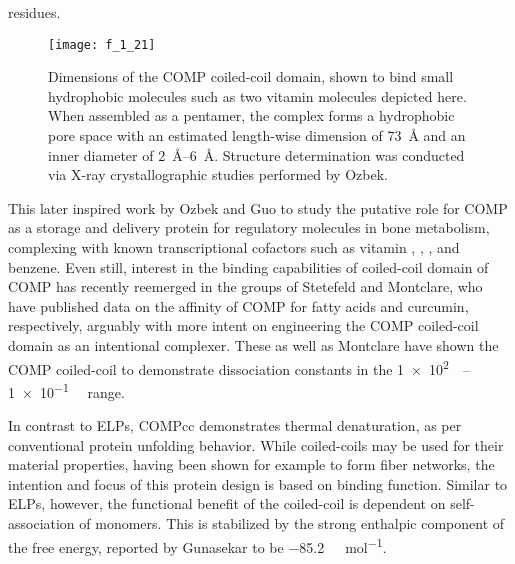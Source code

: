 \begin{refsection}
residues.\cite{Burkhard2001} 
\begin{figure}[h!] \centering \texttt{[image: f\_1\_21]}
    \caption[Dimensions of the COMP coiled-coil domain, shown to bind small
        hydrophobic molecules such as two vitamin  molecules depicted
        here. When assembled as a pentamer, the complex forms a hydrophobic pore
        space with an estimated length-wise dimension of \SI{73}{\angstrom} and
    an inner diameter of \SIrange{2}{6}{\angstrom}. Structure determination was
conducted via X-ray crystallographic studies performed by Ozbek.]{Dimensions of
    the COMP coiled-coil domain, shown to bind small hydrophobic molecules such
    as two vitamin  molecules depicted here. When assembled as a
    pentamer, the complex forms a hydrophobic pore space with an estimated
    length-wise dimension of \SI{73}{\angstrom} and an inner diameter of
    \SIrange{2}{6}{\angstrom}. Structure determination was conducted via X-ray
    crystallographic studies performed by
    Ozbek.\cite{Ozbek2002}}\label{fig:comp_dimensions}
\end{figure}
This later inspired work by Ozbek and Guo to study the putative role for COMP as
a storage and delivery protein for regulatory molecules in bone metabolism,
complexing with known transcriptional cofactors such as vitamin ,
, , and
benzene.\cite{Guo1998,Ozbek2002} Even still, interest in the binding
capabilities of coiled-coil domain of COMP has recently reemerged in the groups
of Stetefeld and Montclare, who have published data on the affinity of COMP for
fatty acids and curcumin, respectively, arguably with more intent on engineering
the COMP coiled-coil domain as an intentional
complexer.\cite{McFarlane2012,Gunasekar2009} These as well as Montclare
have shown the COMP coiled-coil to demonstrate dissociation constants in
the
\SIrange[scientific-notation=true,retain-unity-mantissa=false]{1e2}{1e-1}{\micro\moLar}
range.\cite{Haghpanah2010,Guo1998}

In contrast to ELPs, COMPcc demonstrates thermal denaturation, as per
conventional protein unfolding behavior. While coiled-coils may be used for
their material properties, having been shown for example to form fiber
networks,\cite{Apostolovic2010} the intention and focus of this protein design
is based on binding function. Similar to ELPs, however, the functional benefit
of the coiled-coil is dependent on self-association of monomers. This is
stabilized by the strong enthalpic component of the free energy, reported by
Gunasekar to be \SI{-85.2}{\kilo\cal\per\mole}.\cite{Gunasekar2009}


\end{refsection}
